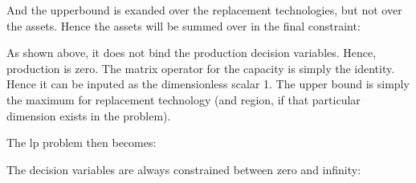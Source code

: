 \documentclass[letterpaper,10pt,english]{sphinxmanual}
\begin{document}
\begin{fulllineitems}
And the upperbound is exanded over the replacement technologies,
but not over the assets. Hence the assets will be summed over in the final
constraint:

\begin{sphinxVerbatim}[commandchars=\\\{\}]
   \PYG{p}{[}    \PYG{p}{]}
   
   
\end{sphinxVerbatim}

As shown above, it does not bind the production decision variables. Hence,
production is zero. The matrix operator for the capacity is simply the identity.
Hence it can be inputed as the dimensionless scalar 1. The upper bound is simply
the maximum for replacement technology (and region, if that particular dimension
exists in the problem).

The lp problem then becomes:

\begin{sphinxVerbatim}[commandchars=\\\{\}]
    
  
       
\end{sphinxVerbatim}

The decision variables are always constrained between zero and infinity:


\end{fulllineitems}
\end{document}
